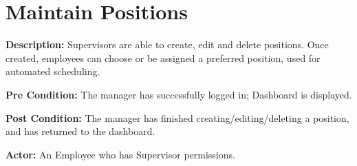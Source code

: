 \documentclass[letterpaper,12pt]{report}
\begin{document}


\pagebreak
\section{Maintain Positions}
\begin{description}
 \item \textbf{Description:} \newline Supervisors are able to create, edit and delete positions.  Once created, employees can choose or be assigned a preferred position, used for automated scheduling.
 \item \textbf{Pre Condition:} \newline The manager has successfully logged in; Dashboard is displayed.
 \item \textbf{Post Condition:} \newline The manager has finished creating/editing/deleting a position, and has returned to the dashboard.
 \item \textbf{Actor:} \newline  An Employee who has Supervisor permissions.
\end{description}
\end{document}
